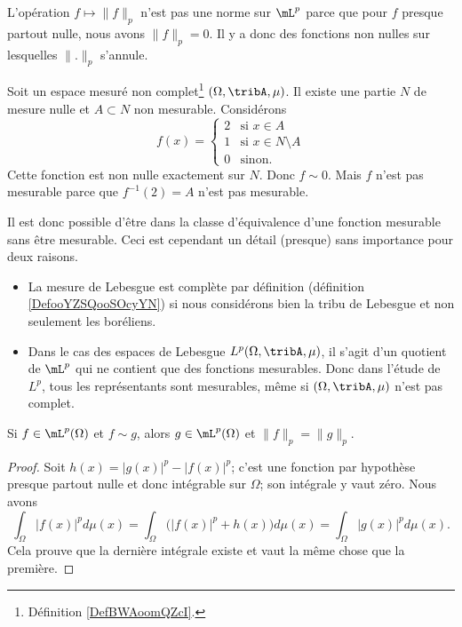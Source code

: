 \begin{normaltext}
	L'opération \( f\mapsto \| f \|_p\) n'est pas une norme sur \( \mL^p\) parce que pour \( f\) presque partout nulle, nous avons \( \| f \|_p=0\). Il y a donc des fonctions non nulles sur lesquelles \( \| . \|_p\) s'annule.
\end{normaltext}

\begin{normaltext}
	Soit un espace mesuré non complet\footnote{Définition \ref{DefBWAoomQZcI}.} \( (\Omega,\tribA,\mu)\). Il existe une partie \( N\) de mesure nulle et \( A\subset N\) non mesurable. Considérons
	\begin{equation}
		f(x)=\begin{cases}
			2 & \text{si } x\in A            \\
			1 & \text{si } x\in N\setminus A \\
			0 & \text{sinon. }
		\end{cases}
	\end{equation}
	Cette fonction est non nulle exactement sur \( N\). Donc \( f\sim 0\). Mais \( f\) n'est pas mesurable parce que \( f^{-1}(2)=A\) n'est pas mesurable.

	Il est donc possible d'être dans la classe d'équivalence d'une fonction mesurable sans être mesurable. Ceci est cependant un détail (presque) sans importance pour deux raisons.
	\begin{itemize}
		\item La mesure de Lebesgue est complète par définition (définition \ref{DefooYZSQooSOcyYN}) si nous considérons bien la tribu de Lebesgue et non seulement les boréliens.
		\item Dans le cas des espaces de Lebesgue \( L^p(\Omega,\tribA,\mu)\), il s'agit d'un quotient de \( \mL^p\) qui ne contient que des fonctions mesurables. Donc dans l'étude de \( L^p\), tous les représentants sont mesurables, même si \( (\Omega,\tribA,\mu)\) n'est pas complet.
	\end{itemize}
\end{normaltext}

\begin{lemma}       \label{LemKZVHVAR}
	Si \( f\in \mL^p(\Omega)\) et \( f\sim g\), alors \( g\in \mL^p(\Omega)\) et \( \| f \|_p=\| g \|_p\).
\end{lemma}

\begin{proof}
	Soit \( h(x)=| g(x) |^p-| f(x) |^p\); c'est une fonction par hypothèse presque partout nulle et donc intégrable sur \( \Omega\); son intégrale y vaut zéro. Nous avons
	\begin{equation}
		\int_{\Omega}| f(x) |^pd\mu(x)=\int_{\Omega}\Big( | f(x) |^p+h(x)\big)d\mu(x)=\int_{\Omega}| g(x) |^pd\mu(x).
	\end{equation}
	Cela prouve que la dernière intégrale existe et vaut la même chose que la première.
\end{proof}

